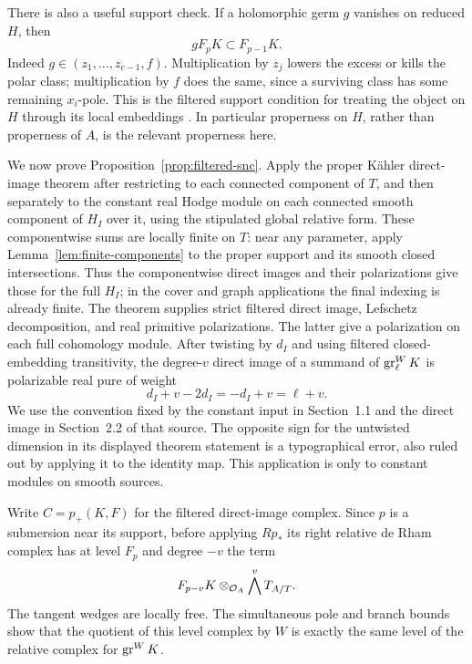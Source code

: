 There is also a useful support check.  If a holomorphic germ \(g\)
vanishes on reduced \(H\), then
\begin{equation}\label{eq:filtered-support-condition}
 gF_pK\subset F_{p-1}K.
\end{equation}
Indeed \(g\in(z_1,\ldots,z_{c-1},f)\).  Multiplication by \(z_j\)
lowers the excess or kills the polar class; multiplication by \(f\)
does the same, since a surviving class has some remaining \(x_i\)-pole.
This is the filtered support condition for treating the object on \(H\)
through its local embeddings \cite[Section~1.17]{Saito1990Kahler}.
In particular properness on \(H\), rather than properness of \(A\),
is the relevant properness here.

We now prove Proposition~\ref{prop:filtered-snc}.  Apply the proper
K\"ahler direct-image theorem
\cite[Theorem~1 and Remark~1.2]{Saito2022Kahler} after restricting to
each connected component of \(T\), and then separately to the constant
real Hodge module on each connected smooth component of \(H_I\) over it,
using the stipulated global relative form.  These componentwise sums are
locally finite on \(T\): near any parameter, apply
Lemma~\ref{lem:finite-components} to the proper support and its smooth
closed intersections.  Thus the componentwise direct images and their
polarizations give those for the full \(H_I\); in the cover and graph
applications the final indexing is already finite.  The theorem supplies
strict filtered direct image, Lefschetz decomposition, and real primitive
polarizations.
The latter give a polarization on each full cohomology module.  After
twisting by \(d_I\) and using filtered closed-embedding transitivity,
the degree-\(v\) direct image of a summand of
\(\operatorname{gr}^W_\ell K\) is polarizable real pure of weight
\begin{equation}\label{eq:direct-image-weight}
 d_I+v-2d_I=-d_I+v=\ell+v.
\end{equation}
We use the convention fixed by the constant input in Section~1.1 and
the direct image in Section~2.2 of that source.  The opposite sign for
the untwisted dimension in its displayed theorem statement is a
typographical error, also ruled out by applying it to the identity map.
This application is only to constant modules on smooth sources.

Write \(C=p_+(K,F)\) for the filtered direct-image complex.  Since
\(p\) is a submersion near its support, before applying \(Rp_*\) its
right relative de Rham complex has at level \(F_p\) and degree \(-v\)
the term
\begin{equation}\label{eq:relative-right-dr}
 F_{p-v}K\otimes_{\mathcal O_A}\bigwedge^v T_{A/T}.
\end{equation}
The tangent wedges are locally free.  The simultaneous pole and branch
bounds show that the quotient of this level complex by \(W\) is exactly
the same level of the relative complex for \(\operatorname{gr}^W K\).

